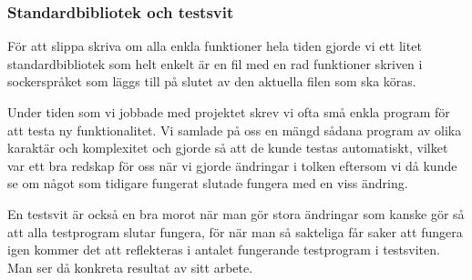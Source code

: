 \documentclass[../Appendix]{subfiles}
\begin{document}
\subsubsection{Standardbibliotek och testsvit}

För att slippa skriva om alla enkla funktioner hela tiden gjorde vi ett litet standardbibliotek
som helt enkelt är en fil med en rad funktioner skriven i sockerspråket som läggs
till på slutet av den aktuella filen som ska köras.

Under tiden som vi jobbade med projektet skrev vi ofta små enkla
program för att testa ny funktionalitet. Vi samlade på oss en mängd sådana program av
olika karaktär och komplexitet och gjorde så att de kunde testas automatiskt, 
vilket var ett bra redskap för oss 
när vi gjorde ändringar i tolken eftersom vi då kunde se om något som tidigare
fungerat slutade fungera med en viss ändring. 

En testsvit är också en bra morot när man gör stora ändringar som kanske gör så att
alla testprogram slutar fungera, för när man så sakteliga får saker att fungera
igen kommer det att reflekteras i antalet fungerande testprogram i testsviten. 
Man ser då konkreta resultat av sitt arbete.



\end{document}

